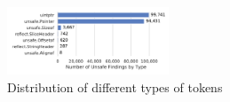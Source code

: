 \begin{figure}[!t]
    \vspace{-12pt}
    \centering
    \includegraphics[width=0.43\textwidth]{gfx/figures/distribution-unsafe-types.pdf}
    \caption{Distribution of different types of \unsafe{} tokens}
    \label{fig:unsafe-tokens-distribution}
\end{figure}